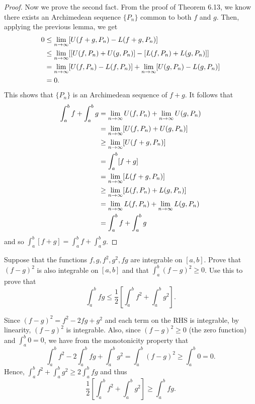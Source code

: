 \documentclass[letterpaper, twoside, 12pt]{book}
\begin{document}
\begin{proof}
    Now we prove the second fact. From the proof of Theorem 6.13, we know
    there exists an Archimedean sequence \(\{P_n\}\) common to both \(f\)
    and \(g\). Then, applying the previous lemma, we get
    \begin{align*}
        0 &\leq  \lim_{n \to \infty} [ U(f + g, P_n) - L(f + g, P_n) ] \\ 
          &\leq \lim_{n \to \infty} [ [U(f, P_n) + U(g, P_n)] - [L(f, P_n) + L(g, P_n)]] \\
          &= \lim_{n \to \infty} [U(f, P_n) - L(f, P_n)] + \lim_{n \to \infty} [U(g, P_n) - L(g, P_n)] \\
          &= 0 .
    \end{align*}
    This shows that \(\{P_n\}\) is an Archimedean sequence of \(f+g\). It follows
    that
    \begin{align*} 
        \int_a^b f + \int_a^b g &= \lim_{n \to \infty} U(f, P_n) + \lim_{n \to \infty} U(g, P_n) \\
                                &= \lim_{n \to \infty} [U(f, P_n) + U(g, P_n)] \\
                                &\geq \lim_{n \to \infty} [U(f + g, P_n)] \\
                                &= \int_a^b [f + g] \\
                                &= \lim_{n \to \infty} [ L(f + g, P_n) ] \\
                                &\geq \lim_{n \to \infty} [L(f, P_n) + L(g, P_n) ] \\
                                &= \lim_{n \to \infty} L(f, P_n) + \lim_{n \to \infty} L(g, P_n) \\
                                &= \int_a^b f + \int_a^b g \\
    \end{align*}
    and so \(\int_a^b [f + g] = \int_a^b f + \int_a^b g \).

\end{proof}


\begin{exercise}[1]
  Suppose that the functions \(f,g,f^2,g^2,fg\) are integrable on \([a,b]\).
  Prove that \((f-g)^2\) is also integrable on \([a,b]\) and that
  \(\int_a^b(f-g)^2\geq0\). Use this to prove that
  \[
    \int_a^b fg
      \leq
    \frac{1}{2}\left[
      \int_a^b f^2 + \int_a^b g^2
    \right]
  .\]
\end{exercise}

\begin{solution}
    Since \((f - g)^2 = f^2 - 2fg + g^2\) and each term on the RHS
    is integrable, by linearity, \((f-g)^2\) is integrable. Also,
    since \((f - g)^2 \geq 0\) (the zero function) and \(\int_a^b 0 = 0\),
    we have from the monotonicity property that
    \[ \int_a^b f^2 - 2 \int_a^b fg + \int_a^b g^2 = \int_a^b (f - g)^2 \geq \int_a^b 0 = 0 .\]
    Hence, \( \int_a^b f^2 + \int_a^b g^2 \geq 2 \int_a^b fg \) and thus
    \[ \frac{1}{2} \left[ \int_a^b f^2 + \int_a^b g^2 \right] \geq \int_a^b fg .\] 
\end{solution}
\end{document}
